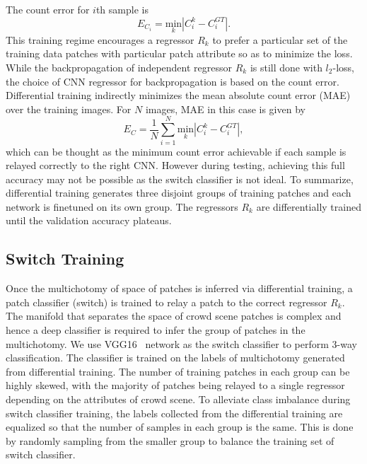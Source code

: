 \documentclass[10pt,twocolumn,letterpaper]{article}
\begin{document}
The count error for $i$th sample is 
\begin{equation}
E_{C_{i}}=\underset{k}{\textrm{min}}|C_{i}^{k}-C_{i}^{GT}|.
\label{eq3}
\end{equation}
This training regime encourages a regressor $R_k$ to prefer a particular set of the
training data patches with particular patch attribute so as to minimize the loss. While the backpropagation of independent regressor $R_k$ is still done with $l_2$-loss,
 the choice of CNN regressor for backpropagation is based on the count error. Differential training indirectly minimizes the mean absolute count error (MAE) over the training images.
For $N$ images, MAE in this case is given by 
\begin{equation}
E_{C}=\frac{1}{N}\sum_{i=1}^{N}\underset{k}{\textrm{min}}|C_{i}^{k}-C_{i}^{GT}|,
\label{eq4}
\end{equation}
which can be thought as the minimum count error achievable if each
sample is relayed correctly to the right CNN. However during testing,
achieving this full accuracy may not be possible as the switch classifier is not ideal. To summarize, differential training generates three disjoint groups of training patches and each network is finetuned on its own group. The regressors $R_k$ are differentially trained until the validation accuracy plateaus.



\subsection{Switch Training}

Once the multichotomy of space of patches is inferred via differential training, a patch classifier (switch) is trained to relay a patch to the correct regressor $R_k$. The manifold that separates the space of crowd scene patches is complex and hence a deep classifier is required to infer the group of patches in the multichotomy. We use VGG16~\cite{simonyan2014very} network as the switch classifier to perform 3-way classification. The classifier is trained on the labels of multichotomy generated from differential training. The number of training patches in each group can be highly skewed, with the majority of patches being relayed to a single regressor depending on the attributes of crowd scene. To alleviate class imbalance during switch classifier training, the labels collected from the differential training are equalized so
that the number of samples in each group is the same. This is done by
randomly sampling from the smaller group to balance the training set of switch classifier.
\end{document}
